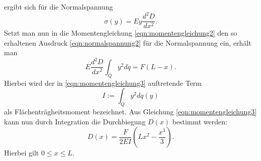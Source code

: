 ergibt sich für die Normalspannung
\begin{equation}
\sigma (y) = E y \frac{d^2 D}{d x^2}.
\label{eqn:normalspannung2}
\end{equation}
Setzt man nun in die Momentengleichung \eqref{eqn:momentengleichung2} den so erhaltenen Ausdruck \eqref{eqn:normalspannung2}
für die Normalspannung ein, erhält man
\begin{equation}
  E \frac{d^2 D}{d x^2} \int_Q y^2 dq = F(L - x).
  \label{eqn:momentengleichung3}
\end{equation}
Hierbei wird der in \eqref{eqn:momentengleichung3} auftretende Term
\begin{equation*}
  I := \int_Q y^2 dq(y)
\end{equation*}
als Flächenträgheitsmoment bezeichnet.
Aus Gleichung \eqref{eqn:momentengleichung3} kann nun durch Integration die Durchbiegung $D(x)$ bestimmt
werden:
\begin{equation}
  D(x) = \frac{F}{2 E I} \left( L x^2 - \frac{x^3}{3} \right).
  \label{eqn:durchbiegungeinseitig}
\end{equation}
Hierbei gilt $0 \leq x \leq L$.


